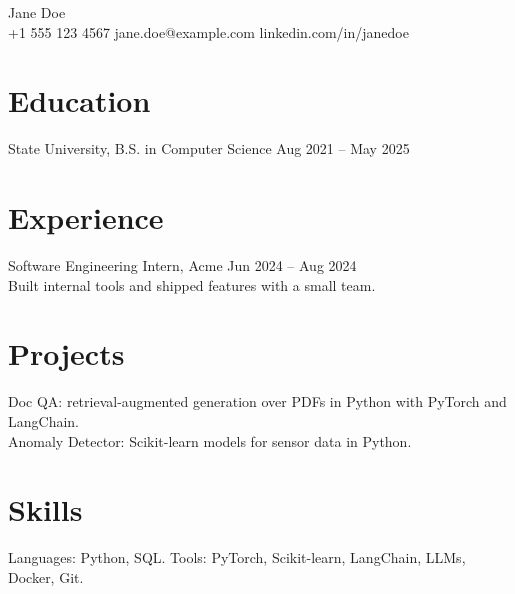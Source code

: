 \documentclass[10pt]{article}
\begin{document}
\begin{center}{\Large Jane Doe}\\ +1 555 123 4567 \quad jane.doe@example.com \quad linkedin.com/in/janedoe\end{center}
\section*{Education}
State University, B.S. in Computer Science \hfill Aug 2021 -- May 2025
\section*{Experience}
Software Engineering Intern, Acme \hfill Jun 2024 -- Aug 2024\\
Built internal tools and shipped features with a small team.
\section*{Projects}
Doc QA: retrieval-augmented generation over PDFs in Python with PyTorch and LangChain.\\
Anomaly Detector: Scikit-learn models for sensor data in Python.
\section*{Skills}
Languages: Python, SQL. Tools: PyTorch, Scikit-learn, LangChain, LLMs, Docker, Git.
\end{document}
